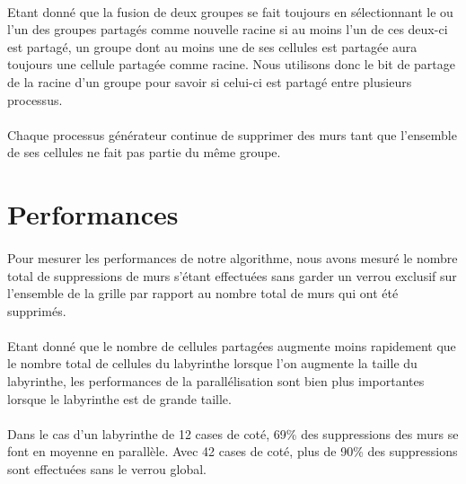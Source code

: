 \documentclass[a4paper,french]{article}
\begin{document}
    \paragraph{} Etant donné que la fusion de deux groupes se fait toujours en
sélectionnant le ou l'un des groupes partagés comme nouvelle racine si au moins
l'un de ces deux-ci est partagé, un groupe dont au moins une de ses cellules
est partagée aura toujours une cellule partagée comme racine. Nous utilisons
donc le bit de partage de la racine d'un groupe pour savoir si celui-ci est
partagé entre plusieurs processus.

    \paragraph{} Chaque processus générateur continue de supprimer des murs tant
que l'ensemble de ses cellules ne fait pas partie du même groupe.

\section{Performances}

    \paragraph{} Pour mesurer les performances de notre algorithme, nous avons
mesuré le nombre total de suppressions de murs s'étant effectuées sans garder un
verrou exclusif sur l'ensemble de la grille par rapport au nombre total de murs
qui ont été supprimés.

    \paragraph{} Etant donné que le nombre de cellules partagées augmente moins
rapidement que le nombre total de cellules du labyrinthe lorsque l'on augmente
la taille du labyrinthe, les performances de la parallélisation sont bien plus
importantes lorsque le labyrinthe est de grande taille.

    \paragraph{} Dans le cas d'un labyrinthe de 12 cases de coté, 69\% des
suppressions des murs se font en moyenne en parallèle. Avec 42 cases de coté,
plus de 90\% des suppressions sont effectuées sans le verrou global.
\end{document}
